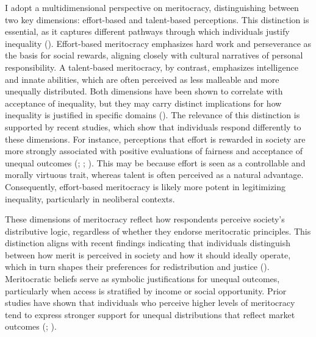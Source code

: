 \documentclass[
  12pt,
]{article}
\begin{document}
I adopt a multidimensional perspective on meritocracy, distinguishing
between two key dimensions: effort-based and talent-based perceptions.
This distinction is essential, as it captures different pathways through
which individuals justify inequality
(). Effort-based meritocracy
emphasizes hard work and perseverance as the basis for social rewards,
aligning closely with cultural narratives of personal responsibility. A
talent-based meritocracy, by contrast, emphasizes intelligence and
innate abilities, which are often perceived as less malleable and more
unequally distributed. Both dimensions have been shown to correlate with
acceptance of inequality, but they may carry distinct implications for
how inequality is justified in specific domains
().
The relevance of this distinction is supported by recent studies, which
show that individuals respond differently to these dimensions. For
instance, perceptions that effort is rewarded in society are more
strongly associated with positive evaluations of fairness and acceptance
of unequal outcomes (; ;
). This may be because
effort is seen as a controllable and morally virtuous trait, whereas
talent is often perceived as a natural advantage. Consequently,
effort-based meritocracy is likely more potent in legitimizing
inequality, particularly in neoliberal contexts.

These dimensions of meritocracy reflect how respondents perceive
society's distributive logic, regardless of whether they endorse
meritocratic principles. This distinction aligns with recent findings
indicating that individuals distinguish between how merit is perceived
in society and how it should ideally operate, which in turn shapes their
preferences for redistribution and justice
(). Meritocratic beliefs serve as symbolic justifications for
unequal outcomes, particularly when access is stratified by income or
social opportunity. Prior studies have shown that individuals who
perceive higher levels of meritocracy tend to express stronger support
for unequal distributions that reflect market outcomes
(;
).
\end{document}
